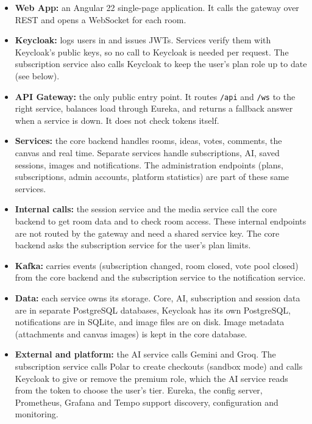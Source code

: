 \documentclass[12pt,a4paper]{report}
\begin{document}
\begin{itemize}
  \item \textbf{Web App:} an Angular 22 single-page application. It calls the gateway over REST and opens a WebSocket for each room.
  \item \textbf{Keycloak:} logs users in and issues JWTs. Services verify them with Keycloak's public keys, so no call to Keycloak is needed per request. The subscription service also calls Keycloak to keep the user's plan role up to date (see below).
  \item \textbf{API Gateway:} the only public entry point. It routes \texttt{/api} and \texttt{/ws} to the right service, balances load through Eureka, and returns a fallback answer when a service is down. It does not check tokens itself.
  \item \textbf{Services:} the core backend handles rooms, ideas, votes, comments, the canvas and real time. Separate services handle subscriptions, AI, saved sessions, images and notifications. The administration endpoints (plans, subscriptions, admin accounts, platform statistics) are part of these same services.
  \item \textbf{Internal calls:} the session service and the media service call the core backend to get room data and to check room access. These internal endpoints are not routed by the gateway and need a shared service key. The core backend asks the subscription service for the user's plan limits.
  \item \textbf{Kafka:} carries events (subscription changed, room closed, vote pool closed) from the core backend and the subscription service to the notification service.
  \item \textbf{Data:} each service owns its storage. Core, AI, subscription and session data are in separate PostgreSQL databases, Keycloak has its own PostgreSQL, notifications are in SQLite, and image files are on disk. Image metadata (attachments and canvas images) is kept in the core database.
  \item \textbf{External and platform:} the AI service calls Gemini and Groq. The subscription service calls Polar to create checkouts (sandbox mode) and calls Keycloak to give or remove the premium role, which the AI service reads from the token to choose the user's tier. Eureka, the config server, Prometheus, Grafana and Tempo support discovery, configuration and monitoring.
\end{itemize}

\end{document}
